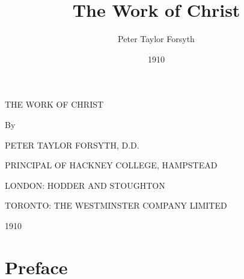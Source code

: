\documentclass[12pt,a5paper,twoside,titlepage]{book}
\author{Peter Taylor Forsyth}
\title{The Work of Christ}
\date{1910}
\begin{document}
\frontmatter


\begin{titlepage}
\centering
{\LARGE THE WORK OF CHRIST \par}
\vspace{2in}
By \\
{\large PETER TAYLOR FORSYTH, D.D. \par}
{\footnotesize PRINCIPAL OF HACKNEY COLLEGE, HAMPSTEAD \par}
\vfill
{\small LONDON: HODDER AND STOUGHTON \par}
{\small TORONTO: THE WESTMINSTER COMPANY LIMITED \par}
1910
\end{titlepage}





\chapter{Preface} 
\end{document}
